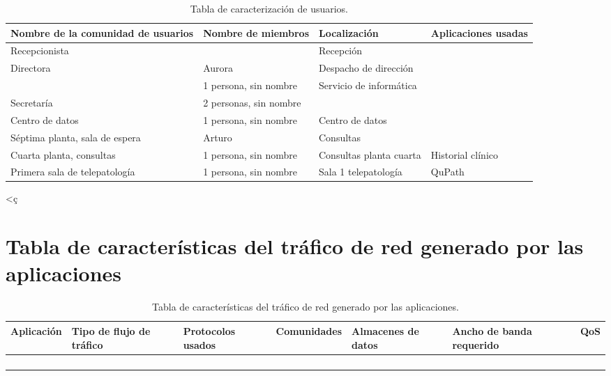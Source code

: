 \begin{table}[H]
	\begin{center}
		\begin{tabular}{|l|l|l|l|}
			\hline 
			Nombre de la comunidad de usuarios & Nombre de miembros & Localización & Aplicaciones usadas \\ 
			\hline \hline
			Recepcionista & & Recepción  & \\ \hline
			Directora & Aurora & Despacho de dirección  & \\ \hline
			 & 1 persona, sin nombre & Servicio de informática & \\ \hline
		    Secretaría & 2 personas, sin nombre  & &  \\ \hline
		    Centro de datos & 1 persona, sin nombre  & Centro de datos &  \\ \hline
		    Séptima planta, sala de espera & Arturo  & Consultas &  \\ \hline
		    Cuarta planta, consultas & 1 persona, sin nombre  & Consultas planta cuarta & Historial clínico  \\ \hline
		    Primera sala de telepatología & 1 persona, sin nombre & Sala 1 telepatología & QuPath
		\end{tabular}
		\caption{Tabla de caracterización de usuarios.}
		\label{tabla:tabla5}<ç
	\end{center}
\end{table}

\section{Tabla de características del tráfico de red generado por las aplicaciones}

\begin{table}[H]
	\begin{center}
		\begin{tabular}{|l|l|l|l|l|l|l|}
			\hline 
			Aplicación & Tipo de flujo de tráfico & Protocolos usados & Comunidades & Almacenes de datos & Ancho de banda requerido & QoS \\ 
			\hline \hline
			& & & & & & \\ \hline
			& & & & & & \\ \hline
			& & & & & & \\ \hline
			& & & & & &  \\ \hline
		\end{tabular}
		\caption{Tabla de características del tráfico de red generado por las aplicaciones.}
		\label{tabla:tabla6}
	\end{center}
\end{table}

%
%

       
